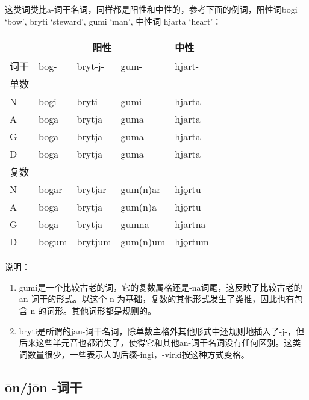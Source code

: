 这类词类比a-词干名词，同样都是阳性和中性的，参考下面的例词，阳性词bogi
`bow', bryti `steward', gumi `man', 中性词 hjarta `heart'：

\begin{longtable}{lllll}
  \toprule
     & \multicolumn{3}{c}{\textbf{阳性}} & \textbf{中性}                      \\
  \midrule
  \endhead
  \bottomrule
  \endfoot
  词干 & bog-                            & bryt-j-     & gum-     & hjart-  \\
  单数 &                                 &             &          &         \\
  N  & bogi                            & bryti       & gumi     & hjarta  \\
  A  & boga                            & brytja      & guma     & hjarta  \\
  G  & boga                            & brytja      & guma     & hjarta  \\
  D  & boga                            & brytja      & guma     & hjarta  \\
  复数 &                                 &             &          &         \\
  N  & bogar                           & brytjar     & gum(n)ar & hjǫrtu  \\
  A  & boga                            & brytja      & gum(n)a  & hjǫrtu  \\
  G  & boga                            & brytja      & gumna    & hjartna \\
  D  & bogum                           & brytjum     & gum(n)um & hjǫrtum \\
\end{longtable}

说明：

\begin{enumerate}
  \item
        gumi是一个比较古老的词，它的复数属格还是-na词尾，这反映了比较古老的an-词干的形式。以这个-n-为基础，复数的其他形式发生了类推，因此也有包含-n-的词形。其他词形都是规则的。
  \item
        bryti是所谓的jan-词干名词，除单数主格外其他形式中还规则地插入了-j-，但后来这些半元音也都消失了，使得它和其他an-词干名词没有任何区别。这类词数量很少，一些表示人的后缀-ingi，-virki按这种方式变格。
\end{enumerate}

\subsection{ōn/jōn -词干}
\label{ōn/jōn -词干}

